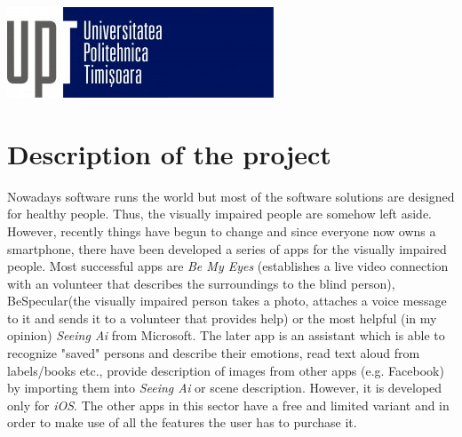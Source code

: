 \documentclass{article}[11]
\begin{document}
\begin{titlepage}




\vspace{3.5cm}

\includegraphics{./imgs/UptLogo.jpg}\\[1cm] %
 

\vfill %

\end{titlepage}

\tableofcontents
\newpage

\section{Description of the project}
	Nowadays software runs the world but most of the software solutions are designed for healthy people. Thus,  the visually impaired people are somehow left aside. However, recently things have begun to change and since everyone now owns a smartphone, there have been developed a series of apps for the visually impaired people. Most successful apps are \emph{Be My Eyes} (establishes a live video connection with an volunteer that describes the surroundings to the blind person), BeSpecular(the visually impaired person takes a photo, attaches a voice message to it and sends it to a volunteer that provides help) or the most helpful (in my opinion) \emph{Seeing Ai} from Microsoft. The later \ac{app} is an assistant which is able to recognize "saved" persons and describe their emotions, read text aloud from labels/books etc., provide description of images from other \ac{apps} (e.g. Facebook) by importing them into \emph{Seeing Ai} or scene description. However, it is developed only for \emph{iOS}. The other apps in this sector have a free and limited variant and in order to make use of all the features the user has to purchase it. \\
	
\end{document}
